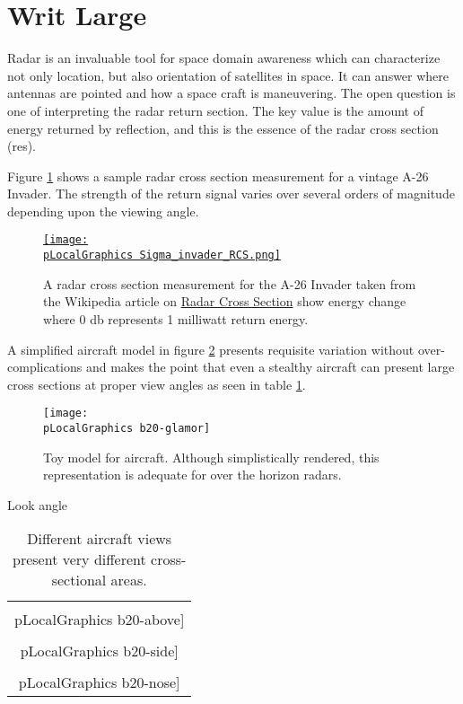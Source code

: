 % 

\section{Writ Large}

Radar is an invaluable tool for space domain awareness which can characterize not only location, but also orientation of satellites in space. It can answer where antennas are pointed and how a space craft is maneuvering. The open question is one of interpreting the radar return section. The key value is the amount of energy returned by reflection, and this is the essence of the radar cross section (res).

Figure \ref{fig:wiki} shows a sample radar cross section measurement for a vintage A-26 Invader. The strength of the return signal varies over several orders of magnitude depending upon the viewing angle.

\begin{figure}[htbp]
\begin{center}
	\href{https://en.wikipedia.org/wiki/Radar_cross_section#/media/File:Sigma_invader_RCS.png}{
		\texttt{[image: \\pLocalGraphics Sigma\_invader\_RCS.png]} }
\caption{A radar cross section measurement for the A-26 Invader taken from the Wikipedia article on \href{https://en.wikipedia.org/wiki/Radar_cross_section}{Radar Cross Section} show energy change where 0 db represents 1 milliwatt return energy.}
\label{fig:wiki}
\end{center}
\end{figure}

A simplified aircraft model in figure \ref{fig:toy} presents requisite variation without over-complications and makes the point that even a stealthy aircraft can present large cross sections at proper view angles as seen in table \ref{tab:views}.
\begin{figure}[htbp] 
   \centering
   \texttt{[image: \\pLocalGraphics b20-glamor]} 
   \caption{Toy model for aircraft. Although simplistically rendered, this representation is adequate for over the horizon radars.}
   \label{fig:toy}
\end{figure}

Look angle
\begin{table}[htp]
\begin{center}
\begin{tabular}{c}
	\texttt{[image: \\pLocalGraphics b20-above]} \\
	\texttt{[image: \\pLocalGraphics b20-side]} \\
	\texttt{[image: \\pLocalGraphics b20-nose]} \\
\end{tabular}
\end{center}
\caption{Different aircraft views present very different cross-sectional areas.}
\label{tab:views}
\end{table}%


